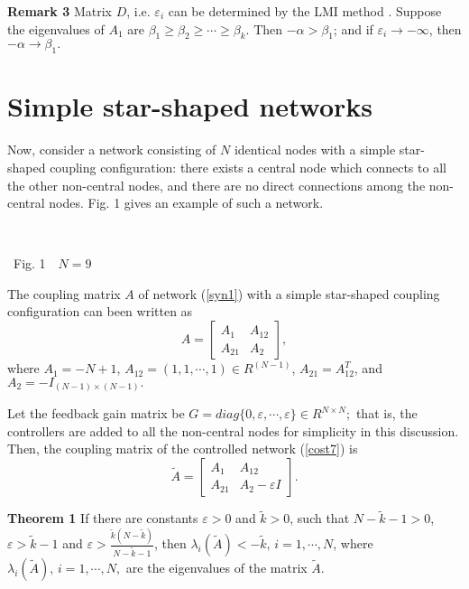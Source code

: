 \documentclass[11pt]{article}
\def\dref#1{(\ref{#1})}
\begin{document}
\textbf {Remark 3} Matrix $D$, i.e. $\varepsilon_i$ can be
determined by the LMI method \cite{Lmi}. Suppose the eigenvalues of
$A_1$ are $\beta_1\geq\beta_2\geq\cdots\geq\beta_k$. Then
$-\alpha>\beta_1$; and if $\varepsilon_i\rightarrow-\infty$, then
$-\alpha\rightarrow\beta_1.$

\section{Simple star-shaped networks}

\quad Now, consider a network consisting of $N$ identical nodes with
a simple star-shaped coupling configuration: there exists a central
node which connects to all the other non-central nodes, and there
are no direct connections among the non-central nodes. Fig. 1 gives
an example of such a network.
\begin{center}
\quad\unitlength=1cm \hbox{\hspace*{0.1cm} 
 }
\end{center}
\vskip-0.6cm
\qquad\qquad\qquad\qquad\qquad\qquad\qquad\qquad\qquad\quad\, Fig.
1\,\,\,\, $N=9$

The coupling matrix $A$ of network \dref{syn1} with a simple
star-shaped coupling configuration can been written as
\begin{equation} \label{syn4}
 A=\left[\begin{array}{cc}
 A_1  &  A_{12}  \\
 A_{21}    &  A_2
\end{array}\right],
\end{equation}
where $A_1=-N+1$, $A_{12}=(1,1,\cdots,1)\in R^{(N-1)}$,
$A_{21}=A_{12}^T$, and $A_2=-I_{(N-1)\times(N-1)}.$

Let the feedback gain matrix be $
G=diag\{0,\varepsilon,\cdots,\varepsilon\}\in R^{N\times N};$ that
is, the controllers are added to all the non-central nodes for
simplicity in this discussion. Then, the coupling matrix of the
controlled network \dref{cost7} is
$$\tilde{A}=\left[\begin{array}{cc}
 A_1  &  A_{12}  \\
 A_{21}    &  A_2-\varepsilon I
\end{array}\right].
$$

\textbf {Theorem 1} If there are constants $\varepsilon>0$ and
$\tilde{k}>0$, such that $N-\tilde{k}-1>0$,
$\varepsilon>\tilde{k}-1$ and
$\varepsilon>\frac{\tilde{k}(N-\tilde{k})}{N-\tilde{k}-1}$, then
$\lambda_i(\tilde{A})<-\tilde{k},\,i=1,\cdots,N$, where
$\lambda_i(\tilde{A}),\,i=1,\cdots,N,$ are the eigenvalues of the
matrix $\tilde{A}$.
\end{document}
